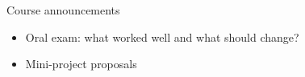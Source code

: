 \begin{frame}{Course announcements}
  \begin{itemize}
  \item Oral exam: what worked well and what should change?
  \item Mini-project proposals
  \end{itemize}
\end{frame}

